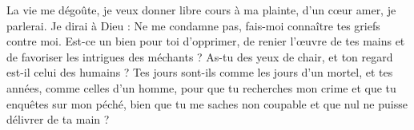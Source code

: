 \lettrine{L}{}a vie me dégoûte, je veux donner libre cours à ma plainte, d’un cœur amer, je parlerai.
Je dirai à Dieu : Ne me condamne pas, fais-moi connaître tes griefs contre moi.
Est-ce un bien pour toi d’opprimer, de renier l’œuvre de tes mains et de favoriser les intrigues des méchants ?
As-tu des yeux de chair, et ton regard est-il celui des humains ? Tes jours sont-ils comme les jours d’un mortel, et tes années, comme celles d’un homme, pour que tu recherches mon crime et que tu enquêtes sur mon péché, bien que tu me saches non coupable et que nul ne puisse délivrer de ta main ?